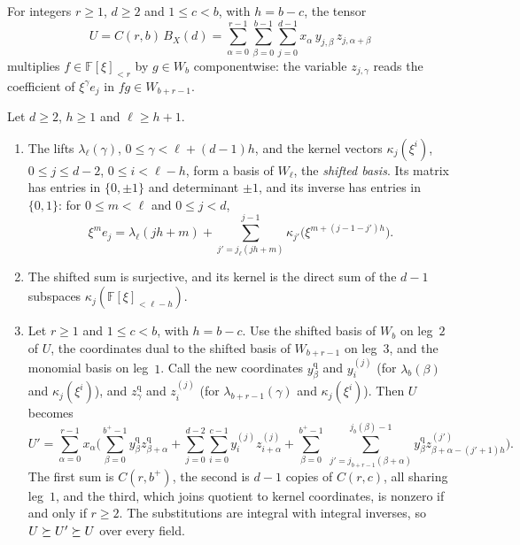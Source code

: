 For integers \(r\ge1\), \(d\ge2\) and \(1\le c<b\), with \(h=b-c\), the
tensor
\begin{equation}\label{eq:stage-U}
 U=C(r,b)\,B_X(d)=\sum_{\alpha=0}^{r-1}\sum_{\beta=0}^{b-1}\sum_{j=0}^{d-1}
 x_\alpha\,y_{j,\beta}\,z_{j,\alpha+\beta}
\end{equation}
multiplies \(f\in\mathbb F[\xi]_{<r}\) by \(g\in W_b\) componentwise: the
variable \(z_{j,\gamma}\) reads the coefficient of \(\xi^\gamma e_j\) in
\(fg\in W_{b+r-1}\).

\begin{lemma}\label{lem:shifted-chain}
Let \(d\ge2\), \(h\ge1\) and \(\ell\ge h+1\).
\begin{enumerate}
\item[(a)] The lifts \(\lambda_\ell(\gamma)\), \(0\le\gamma<\ell+(d-1)h\),
and the kernel vectors \(\kappa_j(\xi^i)\), \(0\le j\le d-2\),
\(0\le i<\ell-h\), form a basis of \(W_\ell\), the \emph{shifted basis}.
Its matrix has entries in \(\{0,\pm1\}\) and determinant \(\pm1\), and its
inverse has entries in \(\{0,1\}\): for \(0\le m<\ell\) and \(0\le j<d\),
\begin{equation}\label{eq:stage-inverse}
 \xi^me_j=\lambda_\ell(jh+m)
 +\sum_{j'=j_\ell(jh+m)}^{j-1}\kappa_{j'}\bigl(\xi^{m+(j-1-j')h}\bigr).
\end{equation}
\item[(b)] The shifted sum is surjective, and its kernel is the direct
sum of the \(d-1\) subspaces \(\kappa_j(\mathbb F[\xi]_{<\ell-h})\).
\item[(c)] Let \(r\ge1\) and \(1\le c<b\), with \(h=b-c\). Use the shifted
basis of \(W_b\) on leg~\(2\) of \(U\), the coordinates dual to the
shifted basis of \(W_{b+r-1}\) on leg~\(3\), and the monomial basis on
leg~\(1\). Call the new coordinates \(y^{\mathrm q}_\beta\) and
\(y^{(j)}_i\) (for \(\lambda_b(\beta)\) and \(\kappa_j(\xi^i)\)), and
\(z^{\mathrm q}_\gamma\) and \(z^{(j)}_i\) (for
\(\lambda_{b+r-1}(\gamma)\) and \(\kappa_j(\xi^i)\)). Then \(U\) becomes
\begin{equation}\label{eq:stage-tensor}
 U'=\sum_{\alpha=0}^{r-1}x_\alpha\Biggl(
 \sum_{\beta=0}^{b^+-1}y^{\mathrm q}_\beta z^{\mathrm q}_{\beta+\alpha}
 +\sum_{j=0}^{d-2}\sum_{i=0}^{c-1}y^{(j)}_iz^{(j)}_{i+\alpha}
 +\sum_{\beta=0}^{b^+-1}\ \sum_{j'=j_{b+r-1}(\beta+\alpha)}^{j_b(\beta)-1}
 y^{\mathrm q}_\beta z^{(j')}_{\beta+\alpha-(j'+1)h}\Biggr).
\end{equation}
The first sum is \(C(r,b^+)\), the second is \(d-1\) copies of \(C(r,c)\),
all sharing leg~\(1\), and the third, which joins quotient to kernel
coordinates, is nonzero if and only if \(r\ge2\). The substitutions are
integral with integral inverses, so \(U\succeq U'\succeq U\) over every
field.
\end{enumerate}
\end{lemma}

